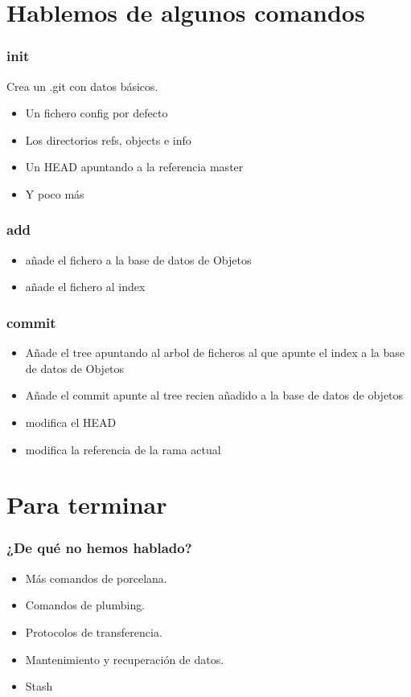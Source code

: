 \documentclass[10pt]{beamer}
\begin{document}
  \section*{Hablemos de algunos comandos}

  \begin{frame}[containsverbatim]
    \frametitle{init}
    Crea un .git con datos básicos.
    \begin{itemize}
      \item Un fichero config por defecto
      \item Los directorios refs, objects e info
      \item Un HEAD apuntando a la referencia master
      \item Y poco más
    \end{itemize}
  \end{frame}

  \begin{frame}[containsverbatim]
    \frametitle{add}
    \begin{itemize}
      \item añade el fichero a la base de datos de Objetos
      \item añade el fichero al index
    \end{itemize}
  \end{frame}

  \begin{frame}[containsverbatim]
    \frametitle{commit}
    \begin{itemize}
      \item Añade el tree apuntando al arbol de ficheros al que apunte el index a la base de datos de Objetos
      \item Añade el commit apunte al tree recien añadido a la base de datos de objetos
      \item modifica el HEAD
      \item modifica la referencia de la rama actual
    \end{itemize}
  \end{frame}

  \section*{Para terminar}

  \begin{frame}[containsverbatim]
    \frametitle{¿De qué no hemos hablado?}
    \begin{itemize}
        \item Más comandos de porcelana.
        \item Comandos de plumbing.
        \item Protocolos de transferencia.
        \item Mantenimiento y recuperación de datos.
        \item Stash
    \end{itemize}
  \end{frame}
\end{document}
